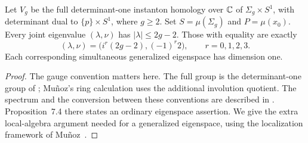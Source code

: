 \begin{lemma}\label{lem:caps:extreme}
Let $V_g$ be the full determinant-one instanton homology over $\mathbb C$ of
$\Sigma_g\times S^1$, with determinant dual to $\{p\}\times S^1$,
where $g\ge2$.  Set $S=\mu(\Sigma_g)$ and $P=\mu(x_0)$.
Every joint eigenvalue $(\lambda,\nu)$ has $|\lambda|\le2g-2$.
Those with equality are exactly
\begin{equation}\label{eq:caps:extreme-spectrum}
       (\lambda,\nu)=\bigl(i^r(2g-2),(-1)^r2\bigr),
                  \qquad r=0,1,2,3.
\end{equation}
Each corresponding simultaneous generalized eigenspace has dimension one.
\end{lemma}

\begin{proof}
The gauge convention matters here.  The full group is the determinant-one
group of \cite[Section~7.1]{KronheimerMrowka2010}; Mu\~noz's ring
calculation uses the additional involution quotient.  The spectrum and the
conversion between these conventions are described in
\cite[Proposition~7.1 and Section~7.2]{KronheimerMrowka2010}.
Proposition~7.4 there states an ordinary eigenspace assertion.  We give the
extra local-algebra argument needed for a generalized eigenspace,
using the localization framework of
Mu\~noz~\cite[Section~5, equations~(6)--(7)]{Munoz1999Ring}.


\end{proof}
